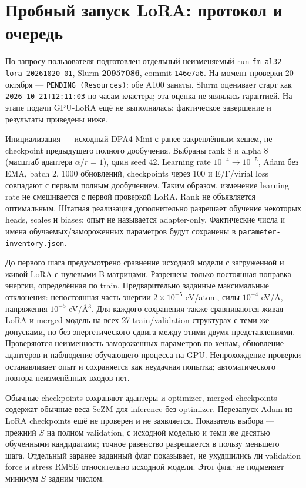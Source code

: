 \documentclass[11pt,a4paper]{article}
\begin{document}
\section{Пробный запуск LoRA: протокол и очередь}
\label{sec:lora-plan}
По запросу пользователя подготовлен отдельный неизменяемый run
\texttt{fm-al32-lora-20261020-01}, Slurm \textbf{20957086},
commit \texttt{146e7a6}. На момент проверки 20 октября ---
\texttt{PENDING (Resources)}: обе A100 заняты. Slurm оценивает
старт как \texttt{2026-10-21T12:11:03} по часам кластера;
эта оценка не являлась гарантией. На этапе подачи GPU-LoRA ещё не
выполнялась; фактическое завершение и результаты приведены ниже.

Инициализация --- исходный DPA4-Mini с ранее закреплённым хешем,
не checkpoint предыдущего полного дообучения. Выбраны rank 8 и
alpha 8 (масштаб адаптера $\alpha/r=1$), один seed 42.
Learning rate $10^{-4}\to10^{-5}$, Adam без EMA, batch 2,
1000 обновлений, checkpoints через 100 и E/F/virial loss совпадают
с первым полным дообучением. Таким образом, изменение learning rate
не смешивается с первой проверкой LoRA. Rank не объявляется оптимальным.
Штатная реализация дополнительно разрешает обучение некоторых heads,
scales и biases; опыт не называется adapter-only.
Фактические числа и имена обучаемых/замороженных параметров будут
сохранены в \texttt{parameter-inventory.json}.

До первого шага предусмотрено сравнение исходной модели с загруженной
и живой LoRA с нулевыми B-матрицами. Разрешена только постоянная
поправка энергии, определённая по train. Предварительно заданные
максимальные отклонения: непостоянная часть энергии
$2\times10^{-5}$ eV/atom, силы $10^{-4}$ eV/\AA,
напряжения $10^{-5}$ eV/\AA$^3$.
Для каждого сохранения также сравниваются живая LoRA и merged-модель
на всех 27 train/validation-структурах с теми же допусками,
но без энергетического сдвига между этими двумя представлениями.
Проверяются неизменность замороженных параметров по хешам,
обновление адаптеров и наблюдение обучающего процесса на GPU.
Непрохождение проверки останавливает опыт и сохраняется как неудачная
попытка; автоматического повтора неизменённых входов нет.

Обычные checkpoints сохраняют адаптеры и optimizer, merged checkpoints
содержат обычные веса SeZM для inference без optimizer.
Перезапуск Adam из LoRA checkpoints ещё не проверен и не заявляется.
Показатель выбора --- прежний $S$ на полном validation, с исходной
моделью и теми же десятью обученными кандидатами; точное равенство
разрешается в пользу меньшего шага. Отдельный заранее заданный флаг
показывает, не ухудшились ли validation force и stress RMSE относительно
исходной модели. Этот флаг не подменяет минимум $S$ задним числом.
\end{document}
